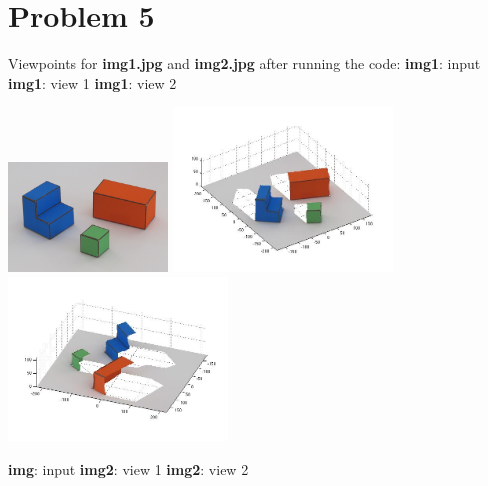 \documentclass[12pt,twoside]{article}
\newcommand{\tabUnit}{3ex}
\newcommand{\tabT}{\hspace*{\tabUnit}}
\begin{document}
\section*{Problem 5}
Viewpoints for \textbf{img1.jpg} and \textbf{img2.jpg} after running the code:
\newline
\newline
\tabT\tabT\tabT \textbf{img1}: input
\tabT\tabT\tabT\tabT\tabT \textbf{img1}: view 1
\tabT\tabT\tabT\tabT\tabT \textbf{img1}: view 2 
\newline

\includegraphics[width = 120pt]{img1}
\includegraphics[width = 165pt]{img1_cv1}
\includegraphics[width = 165pt]{img1_cv2}
\newline

\tabT\tabT \textbf{img}: input
\tabT\tabT\tabT\tabT\tabT \textbf{img2}: view 1
\tabT\tabT\tabT\tabT\tabT \textbf{img2}: view 2 
\newline
\end{document}

